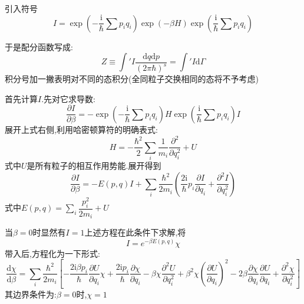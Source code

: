 \vspace*{0.5cm}

引入符号
\[I=\exp(-\dfrac{\mathrm{i} }{\hbar}\sum p_i q_i)\exp(-\beta H) \exp(\dfrac{\mathrm{i} }{\hbar}\sum p_i q_i)\]

于是配分函数写成:
\begin{equation}
  Z\equiv \int' I \dfrac{\mathrm{d} q\mathrm{d} p}{(2\pi \hbar)^{s}}=\int'I \mathrm{d} \Gamma
\end{equation}
积分号加一撇表明对不同的态积分(全同粒子交换相同的态将不予考虑)

\vspace*{0.5cm}

首先计算$I$.先对它求导数:
\[\dfrac{\partial I}{\partial \beta}=-\exp(-\dfrac{\mathrm{i} }{\hbar}\sum p_i q_i)H\exp(\dfrac{\mathrm{i} }{\hbar}\sum p_i q_i)I\]
展开上式右侧,利用哈密顿算符的明确表式:
\[H=-\dfrac{\hbar^2}{2}\sum_i \frac{1}{m_i}\frac{\partial^2 }{\partial q_i^2}+U\]
式中$U$是所有粒子的相互作用势能.展开得到
\begin{equation}
  \dfrac{\partial I}{\partial \beta}=-E(p,q)I+\sum_i \dfrac{\hbar^{2}}{2m_i}\left( \dfrac{2\mathrm{i} }{\hbar}p_i \dfrac{\partial I}{\partial q_i}+\frac{\partial^2 I}{\partial q_i^2} \right) 
\end{equation}
式中$E(p,q)=\sum_i \dfrac{p_i^{2}}{2m_i}+U$

当$\beta=0$时显然有$I=1$上述方程在此条件下求解,将
\begin{equation}
  I=e^{-\beta E(p,q)} \chi
\end{equation}
带入后,方程化为一下形式:
\begin{equation}
  \dfrac{\mathrm{d}\chi}{\mathrm{d} \beta}=\sum_i \frac{\hbar^{2}}{2m_i}\left[ -\dfrac{2\mathrm{i} \beta p_i}{\hbar}\dfrac{\partial U}{\partial q_i}\chi+\dfrac{2\mathrm{i} p_i}{\hbar}\dfrac{\partial \chi}{\partial q_i}-\beta\chi\frac{\partial^2 U}{\partial q_i^2}+\beta^{2}\chi\left( \dfrac{\partial U}{\partial q_i} \right) ^{2}-2\beta \dfrac{\partial \chi}{\partial q_i}\dfrac{\partial U}{\partial q_i}+\frac{\partial^2 \chi}{\partial q_i^2} \right] 
\end{equation}
其边界条件为:$\beta=0$时,$\chi=1$

